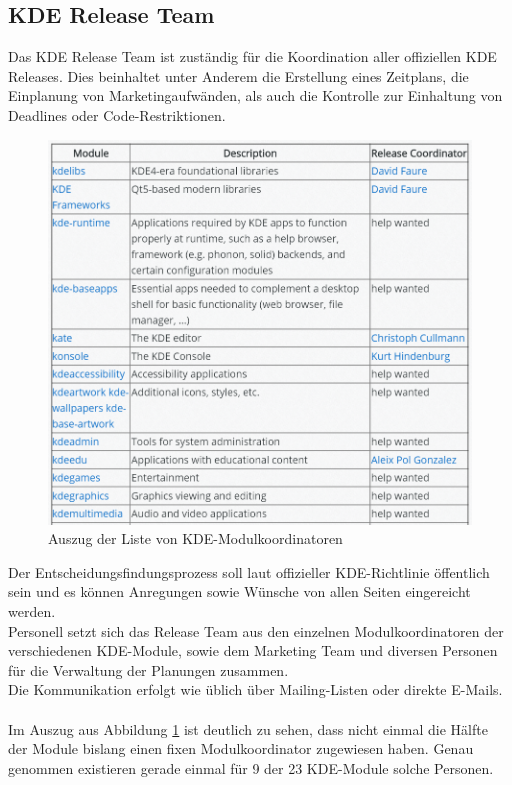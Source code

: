 \documentclass[10pt,a4paper,twocolumn]{article}
\begin{document}
\subsection{KDE Release Team \cite{KDEReleaseTeam}}
Das KDE Release Team ist zuständig für die Koordination aller offiziellen KDE Releases. Dies beinhaltet unter Anderem die Erstellung eines Zeitplans, die Einplanung von Marketingaufwänden, als auch die Kontrolle zur Einhaltung von Deadlines oder Code-Restriktionen.\\
\begin{figure}[h]
	\centering
	\includegraphics[width=\columnwidth]{images/KDE_module_coordinators.png}
	\caption{Auszug der Liste von KDE-Modulkoordinatoren \cite{KDEReleaseTeam}}
	\label{fig:kde_moduleKoord}
\end{figure}
Der Entscheidungsfindungsprozess soll laut offizieller KDE-Richtlinie öffentlich sein und es können Anregungen sowie Wünsche von allen Seiten eingereicht werden.\\
Personell setzt sich das Release Team aus den einzelnen Modulkoordinatoren der verschiedenen KDE-Module, sowie dem Marketing Team und diversen Personen für die Verwaltung der Planungen zusammen.\\
Die Kommunikation erfolgt wie üblich über Mailing-Listen oder direkte E-Mails. \cite{KDEReleaseTeam} \\ \\
Im Auszug aus Abbildung \ref{fig:kde_moduleKoord} ist deutlich zu sehen, dass nicht einmal die Hälfte der Module bislang einen fixen Modulkoordinator zugewiesen haben. Genau genommen existieren gerade einmal für 9 der 23 KDE-Module solche Personen.\\
\end{document}
